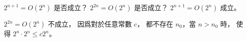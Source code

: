 \startEXERCISE
$2^{n+1} = O(2^n)$ 是否成立？
$2^{2n} = O(2^n)$ 是否成立？
\stopEXERCISE
\startANSWER
$2^{n+1} = O(2^n)$ 成立。

$2^{2n} = O(2^n)$ 不成立，
因爲對於任意常數 $c$，
都不存在 $n_0$，當 $n>n_0$ 時，
使得 $2^n \cdot 2^n \leq c 2^n$。
\stopANSWER
